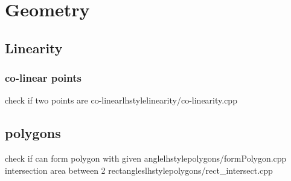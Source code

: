 \section{Geometry}
    \subsection{Linearity}
        \subsubsection{co-linear points}
           {check if two points are co-linear}{lhstyle}{linearity/co-linearity.cpp}
    \subsection{polygons}
         {check if can form polygon with given angle}{lhstyle}{polygons/formPolygon.cpp}
         {intersection area between 2 rectangles}{lhstyle}{polygons/rect_intersect.cpp}
